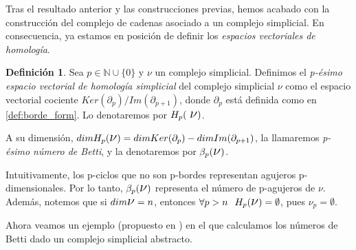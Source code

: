 \documentclass[12pt, a4paper, twoside]{book}
\numberwithin{equation}{section}
\theoremstyle{definition}
\newtheorem{defi}{Definición}
\theoremstyle{remark}
\theoremstyle{plain}
\begin{document}
	Tras el resultado anterior y las construcciones previas, hemos acabado
	con la construcción del complejo de cadenas asociado a un complejo 
	simplicial. En consecuencia, ya estamos en posición de definir los
	\emph{espacios vectoriales de homología}.

	\begin{defi}
		\label{defi:homology}
		Sea $p \in \mathbb{N}\cup\{0\}$ y {\Large $\nu$} un complejo 
		simplicial. Definimos el \textit{p-ésimo espacio vectorial de 
		homología simplicial} del complejo simplicial {\Large $\nu$} 
		como el espacio vectorial cociente $Ker(\partial_{p})/
		Im(\partial_{p+1})$, donde $\partial_{p}$ está definida como
		en \ref{def:borde_form}. Lo denotaremos por $H_{p}(\text{
		{\Large $\nu$}})$.

		A su dimensión, $dimH_{p}(\text{{\Large $\nu$}})=
		dimKer(\partial_{p})-dimIm(\partial_{p+1})$, la 
		llamaremos \textit{p-ésimo número de Betti}, y la denotaremos
		por $\beta_{p}(\text{{\Large $\nu$}})$.
	\end{defi}

	Intuitivamente, los p-ciclos que no son p-bordes representan agujeros
	p-dimensionales. Por lo tanto, $\beta_{p}(\text{{\Large $\nu$}})$ 
	representa el número de p-agujeros de {\Large $\nu$}. Además, notemos 
	que si $dim\text{{\Large $\nu$}}=n$, entonces $\forall p >n 
	\hspace{0.25cm} H_{p}(\text{{\Large $\nu$}})=\emptyset$, pues {\Large 
	$\nu$}$_{p}=\emptyset$.

	Ahora veamos un ejemplo (propuesto en \cite{Intro-Otter}) en el que calculamos 
	los números de Betti dado un complejo simplicial abstracto.
\end{document}
